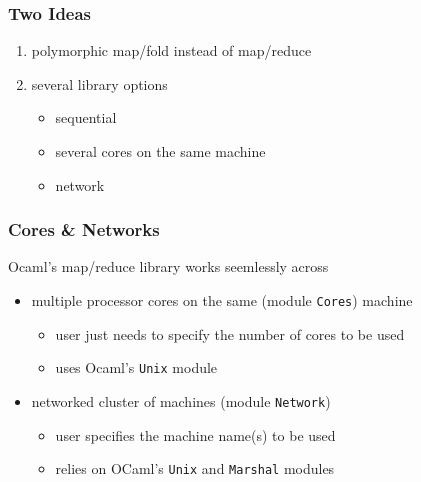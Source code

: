 \documentclass{beamer}
\begin{document}
\begin{frame}\frametitle{Two Ideas}
  \begin{enumerate}
  \item polymorphic map/fold instead of map/reduce

    \bigskip
  \item several library options
    \begin{itemize}
    \item sequential 
    \item several cores on the same machine
    \item network
    \end{itemize}
  \end{enumerate}
\end{frame}

\begin{frame}\frametitle{Cores \& Networks}
  Ocaml's map/reduce library works seemlessly across

  \bigskip
  \begin{itemize}
  \item multiple processor cores on the same (module \texttt{Cores})
    machine
    \begin{itemize}
    \item user just needs to specify the number of cores to be used
    \item uses Ocaml's \texttt{Unix} module
    \end{itemize}

    \bigskip
  \item networked cluster of machines (module \texttt{Network})
    \begin{itemize}
    \item user specifies the machine name(s) to be used
    \item relies on OCaml's \texttt{Unix} and \texttt{Marshal} modules
    \end{itemize}
  \end{itemize}
\end{frame}
\end{document}
